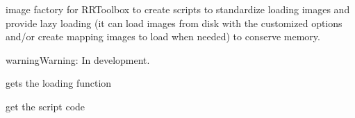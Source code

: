 \documentclass[letterpaper,10pt,english]{sphinxmanual}
\begin{document}

\begin{fulllineitems}
\label{RRtoolbox.lib:RRtoolbox.lib.image.ImFactory}
image factory for RRToolbox to create scripts to standardize loading images and
provide lazy loading (it can load images from disk with the customized options
and/or create mapping images to load when needed) to conserve memory.

\begin{notice}{warning}{Warning:}
In development.
\end{notice}

\begin{fulllineitems}
\label{RRtoolbox.lib:RRtoolbox.lib.image.ImFactory.get_Func}
gets the loading function

\end{fulllineitems}


\begin{fulllineitems}
\label{RRtoolbox.lib:RRtoolbox.lib.image.ImFactory.get_code}
get the script code

\end{fulllineitems}


\begin{fulllineitems}
\label{RRtoolbox.lib:RRtoolbox.lib.image.ImFactory.get_convertionFunc}
\end{fulllineitems}


\begin{fulllineitems}
\label{RRtoolbox.lib:RRtoolbox.lib.image.ImFactory.get_errorFunc}
\end{fulllineitems}


\begin{fulllineitems}
\label{RRtoolbox.lib:RRtoolbox.lib.image.ImFactory.get_loadFunc}
\end{fulllineitems}


\end{fulllineitems}
\end{document}
